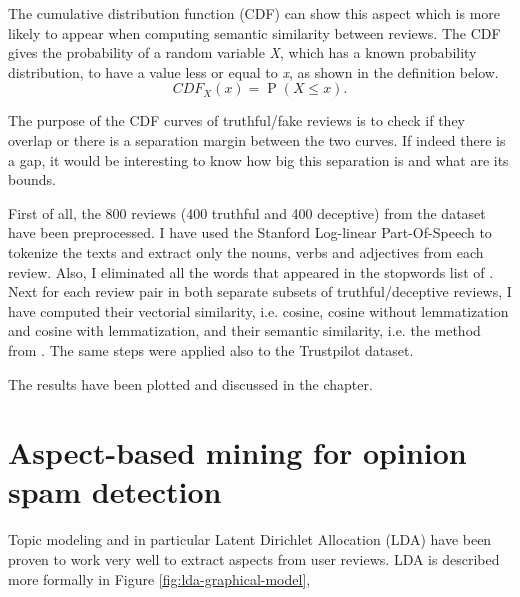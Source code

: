 The cumulative distribution function (CDF) can show this aspect which is more likely to appear when computing semantic similarity between reviews. The CDF gives the probability of a random variable \textit{X}, which has a known probability distribution, to have a value less or equal to \textit{x}, as shown in the definition below.
\begin{equation}
CDF_X(x) = \operatorname{P}(X\leq x).
\end{equation}

The purpose of the CDF curves of truthful/fake reviews is to check if they overlap or there is a separation margin between the two curves. If indeed there is a gap, it would be interesting to know how big this separation is and what are its bounds. 

First of all, the 800 reviews (400 truthful and 400 deceptive) from the \citet{Ott2011} dataset have been preprocessed. I have used the Stanford Log-linear Part-Of-Speech \citet{StanfordNLPTagger} to tokenize the texts and extract only the nouns, verbs and adjectives from each review. Also, I eliminated all the words that appeared in the stopwords list of \citet{SaltonandBuckleyStopWordsAggresive}. Next for each review pair in both separate subsets of truthful/deceptive reviews, I have computed their vectorial similarity, i.e. cosine, cosine without lemmatization and cosine with lemmatization, and their semantic similarity, i.e. the method from \citet{Mihalcea2006}. The same steps were applied also to the Trustpilot dataset.

The results have been plotted and discussed in the  chapter.

\clearpage

\section{Aspect-based mining for opinion spam detection}\label{section:aspect-mining}

Topic modeling and in particular Latent Dirichlet Allocation (LDA) have been proven to work very well to extract aspects from user reviews. LDA is described more formally in Figure \ref{fig:lda-graphical-model},

